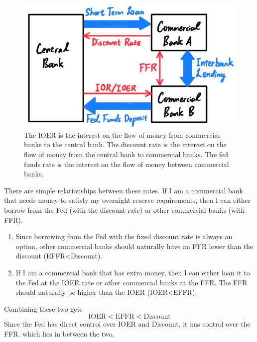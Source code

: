 \documentclass{article}
\begin{document}
    \begin{figure}[H]
      \centering 
      \includegraphics[scale=0.3]{img/3_Interest_Rates.jpg}
      \caption{The IOER is the interest on the flow of money from commercial banks to the central bank. The discount rate is the interest on the flow of money from the central bank to commercial banks. The fed funds rate is the interest on the flow of money between commercial banks.}
      \label{fig:3_Interest_Rates}
    \end{figure}

    \begin{theorem}[FFR]
      There are simple relationships between these rates. If I am a commercial bank that needs money to satisfy my overnight reserve requirements, then I can either borrow from the Fed (with the discount rate) or other commercial banks (with FFR). 
      \begin{enumerate}
        \item Since borrowing from the Fed with the fixed discount rate is always an option, other commercial banks should naturally have an FFR lower than the discount (EFFR<Discount).
        \item If I am a commercial bank that has extra money, then I can either loan it to the Fed at the IOER rate or other commercial banks at the FFR. The FFR should naturally be higher than the IOER (IOER<EFFR). 
      \end{enumerate}
      Combining these two gets 
      \begin{equation}
        \text{IOER} < \text{EFFR} < \text{Discount}
      \end{equation}
      Since the Fed has direct control over IOER and Discount, it has control over the FFR, which lies in between the two. 
    \end{theorem}
\end{document}
